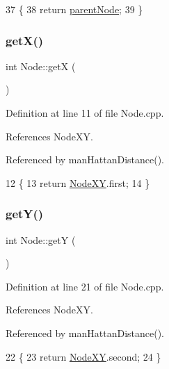 \begin{DoxyCode}
37 \{
38     \textcolor{keywordflow}{return} \hyperlink{class_node_aface6c6a7d38a7cc94090ef35bf9e95a}{parentNode};
39 \}
\end{DoxyCode}
\mbox{\label{class_node_a6c026e5d8c28591c6e2bd08c68619fd1}} 
\subsubsection{\texorpdfstring{get\+X()}{getX()}}
{\footnotesize\ttfamily int Node\+::getX (\begin{DoxyParamCaption}{ }\end{DoxyParamCaption})}



Definition at line 11 of file Node.\+cpp.



References Node\+XY.



Referenced by man\+Hattan\+Distance().


\begin{DoxyCode}
12 \{
13     \textcolor{keywordflow}{return} \hyperlink{class_node_ac85b927d8c9cdc484f169129d317f6f0}{NodeXY}.first;
14 \}
\end{DoxyCode}
\mbox{\label{class_node_abab48a3f494994d4f456897f3372d3ae}} 
\subsubsection{\texorpdfstring{get\+Y()}{getY()}}
{\footnotesize\ttfamily int Node\+::getY (\begin{DoxyParamCaption}{ }\end{DoxyParamCaption})}



Definition at line 21 of file Node.\+cpp.



References Node\+XY.



Referenced by man\+Hattan\+Distance().


\begin{DoxyCode}
22 \{
23     \textcolor{keywordflow}{return} \hyperlink{class_node_ac85b927d8c9cdc484f169129d317f6f0}{NodeXY}.second;
24 \}
\end{DoxyCode}
\mbox{\label{class_node_a2454f74ba33e81bd20945139c73e28fa}} 
